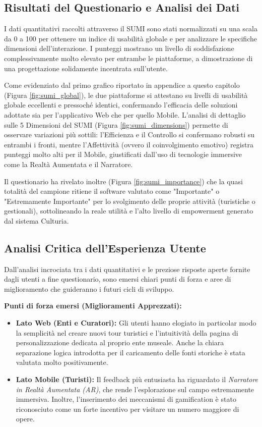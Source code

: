 \subsection{Risultati del Questionario e Analisi dei Dati}
I dati quantitativi raccolti attraverso il SUMI sono stati normalizzati su una scala da 0 a 100 per ottenere un indice di usabilità globale e per analizzare le specifiche dimensioni dell'interazione. I punteggi mostrano un livello di soddisfazione complessivamente molto elevato per entrambe le piattaforme, a dimostrazione di una progettazione solidamente incentrata sull'utente.

Come evidenziato dal primo grafico riportato in appendice a questo capitolo (Figura \ref{fig:sumi_global}), le due piattaforme si attestano su livelli di usabilità globale eccellenti e pressoché identici, confermando l'efficacia delle soluzioni adottate sia per l'applicativo Web che per quello Mobile. L'analisi di dettaglio sulle 5 Dimensioni del SUMI (Figura \ref{fig:sumi_dimensions}) permette di osservare variazioni più sottili: l'Efficienza e il Controllo si confermano robusti su entrambi i fronti, mentre l'Affettività (ovvero il coinvolgimento emotivo) registra punteggi molto alti per il Mobile, giustificati dall'uso di tecnologie immersive come la Realtà Aumentata e il Narratore. 

Il questionario ha rivelato inoltre (Figura \ref{fig:sumi_importance}) che la quasi totalità del campione ritiene il software valutato come "Importante" o "Estremamente Importante" per lo svolgimento delle proprie attività (turistiche o gestionali), sottolineando la reale utilità e l'alto livello di empowerment generato dal sistema Culturia.

\subsection{Analisi Critica dell'Esperienza Utente}
Dall'analisi incrociata tra i dati quantitativi e le preziose risposte aperte fornite dagli utenti a fine questionario, sono emersi chiari punti di forza e aree di miglioramento che guideranno i futuri cicli di sviluppo.

\textbf{Punti di forza emersi (Miglioramenti Apprezzati):}
\begin{itemize}
    \item \textbf{Lato Web (Enti e Curatori):} Gli utenti hanno elogiato in particolar modo la semplicità nel creare nuovi tour turistici e l'intuitività della pagina di personalizzazione dedicata al proprio ente museale. Anche la chiara separazione logica introdotta per il caricamento delle fonti storiche è stata valutata molto positivamente.
    \item \textbf{Lato Mobile (Turisti):} Il feedback più entusiasta ha riguardato il \textit{Narratore in Realtà Aumentata (AR)}, che rende l'esplorazione sul campo estremamente immersiva. Inoltre, l'inserimento dei meccanismi di gamification è stato riconosciuto come un forte incentivo per visitare un numero maggiore di opere.
\end{itemize}

